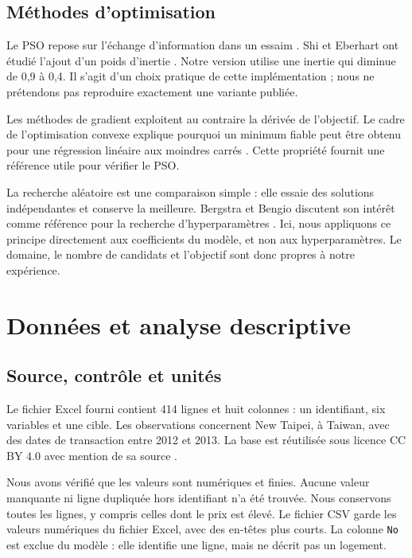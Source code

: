 \documentclass[conference,a4paper]{IEEEtran}
\begin{document}
\subsection{Méthodes d'optimisation}
Le PSO repose sur l'échange d'information dans un essaim \cite{kennedy}. Shi et Eberhart ont étudié l'ajout d'un poids d'inertie \cite{shi}. Notre version utilise une inertie qui diminue de 0,9 à 0,4. Il s'agit d'un choix pratique de cette implémentation ; nous ne prétendons pas reproduire exactement une variante publiée.

Les méthodes de gradient exploitent au contraire la dérivée de l'objectif. Le cadre de l'optimisation convexe explique pourquoi un minimum fiable peut être obtenu pour une régression linéaire aux moindres carrés \cite{boyd}. Cette propriété fournit une référence utile pour vérifier le PSO.

La recherche aléatoire est une comparaison simple : elle essaie des solutions indépendantes et conserve la meilleure. Bergstra et Bengio discutent son intérêt comme référence pour la recherche d'hyperparamètres \cite{bergstra}. Ici, nous appliquons ce principe directement aux coefficients du modèle, et non aux hyperparamètres. Le domaine, le nombre de candidats et l'objectif sont donc propres à notre expérience.

\section{Données et analyse descriptive}
\subsection{Source, contrôle et unités}
Le fichier Excel fourni contient 414 lignes et huit colonnes : un identifiant, six variables et une cible. Les observations concernent New Taipei, à Taiwan, avec des dates de transaction entre 2012 et 2013. La base est réutilisée sous licence CC BY 4.0 avec mention de sa source \cite{uci}.

Nous avons vérifié que les valeurs sont numériques et finies. Aucune valeur manquante ni ligne dupliquée hors identifiant n'a été trouvée. Nous conservons toutes les lignes, y compris celles dont le prix est élevé. Le fichier CSV garde les valeurs numériques du fichier Excel, avec des en-têtes plus courts. La colonne \texttt{No} est exclue du modèle : elle identifie une ligne, mais ne décrit pas un logement.
\end{document}
